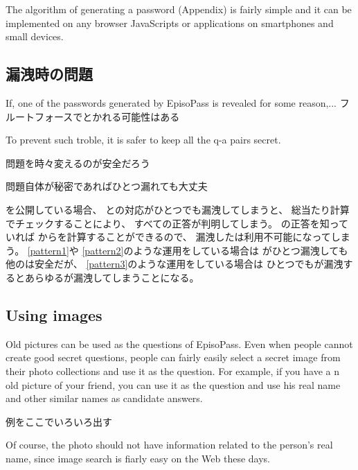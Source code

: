 \documentclass{article}
\begin{document}
The algorithm of generating a password (Appendix)
is fairly simple and
it can be implemented on any browser JavaScripts or
applications on smartphones and small devices.

\subsection{{\PW}漏洩時の問題}

If, one of the passwords generated by EpisoPass is revealed
for some reason,... フルートフォースでとかれる可能性はある

To prevent such troble, it is safer to keep all the q-a pairs secret.

問題を時々変えるのが安全だろう

問題自体が秘密であればひとつ漏れても大丈夫

{\SQ}を公開している場合、
{\SS}と{\PW}の対応がひとつでも漏洩してしまうと、
総当たり計算でチェックすることにより、
すべて{\SQ}の正答が判明してしまう。
{\SQ}の正答を知っていれば
{\SS}から{\PW}を計算することができるので、
漏洩した{\SQ}は利用不可能になってしまう。
%
\ref{pattern1}や
\ref{pattern2}のような運用をしている場合は
{\PW}がひとつ漏洩しても他の{\PW}は安全だが、
\ref{pattern3}のような運用をしている場合は
ひとつでも{\PW}が漏洩するとあらゆる{\PW}が漏洩してしまうことになる。

\subsection{Using images}

Old pictures can be used as the questions of EpisoPass.
Even when people cannot create good secret questions,
people can fairly easily select a secret image from their photo collections
and use it as the question.
For example, if you have a n old picture of your friend,
you can use it as the question
and use his real name and other similar names as candidate answers.

例をここでいろいろ出す


Of course, the photo should not have information related to the
person's real name, since image search is fiarly easy on the Web these days.
\end{document}
